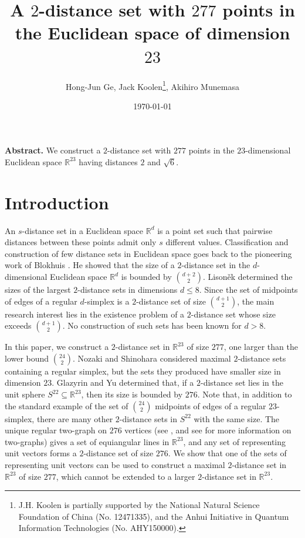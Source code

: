 \documentclass[12pt]{article}
\title{A $2$-distance set with $277$ points in the Euclidean space of dimension $23$}
\author{Hong-Jun Ge, Jack Koolen\thanks{J.H. Koolen is partially supported by the National Natural Science Foundation of China (No. 12471335), and the 
Anhui Initiative in Quantum Information Technologies (No. AHY150000).}, Akihiro Munemasa}
\date{\today}
\theoremstyle{definition}
\newcommand{\R}{\mathbb{R}}
\begin{document}
\maketitle

{\bf Abstract.}
We construct a $2$-distance set with $277$ points in the $23$-dimensional
Euclidean space $\R^{23}$ having distances $2$ and $\sqrt{6}$.

\section{Introduction}

An $s$-distance set in a Euclidean space $\R^d$ is a point set such that pairwise distances between these points admit only $s$ different values.
Classification and construction of few distance sets in Euclidean space
goes back to the pioneering work of Blokhuis 
\cite{MR751955,MR791015}. He showed that the size of a $2$-distance set
in the $d$-dimensional Euclidean space $\R^d$ is bounded by $\binom{d+2}{2}$.
Lison\v{e}k \cite{MR1429084} determined the sizes of the largest
$2$-distance sets in dimensions $d\leq8$.
Since the set of midpoints of edges of a regular $d$-simplex is a
$2$-distance set of size $\binom{d+1}{2}$, the main research interest lies
in the existence problem of a $2$-distance set whose size exceeds $\binom{d+1}{2}$.
No construction of such sets has been known for $d>8$.

In this paper, we construct a $2$-distance set in 
$\R^{23}$ of size $277$, one larger than the lower bound
$\binom{24}{2}$.
Nozaki and Shinohara
\cite{MR4129024} considered maximal $2$-distance sets containing a regular simplex,
but the sets they produced have smaller size in dimension $23$.
Glazyrin and Yu \cite{MR3787558} determined that, 
if a $2$-distance set lies in the unit sphere $S^{22}\subseteq\R^{23}$,
then its size is bounded by $276$.
Note that, in addition to the standard example of 
the set of $\binom{24}{2}$ midpoints of edges of a regular $23$-simplex,
there are many other $2$-distance sets in $S^{22}$ with the same size.
The unique regular two-graph on $276$ vertices (see \cite{MR384597},
and see \cite[Section~1.5]{BCN} for more information on two-graphs)
gives a set of equiangular lines
in $\R^{23}$, and any set of representing unit vectors forms a $2$-distance set
of size $276$. 
We show that one of the sets of representing unit vectors 
can be used to construct a
maximal $2$-distance set in $\R^{23}$ of size $277$, which cannot be extended to a larger $2$-distance set in $\R^{23}$.
\end{document}
